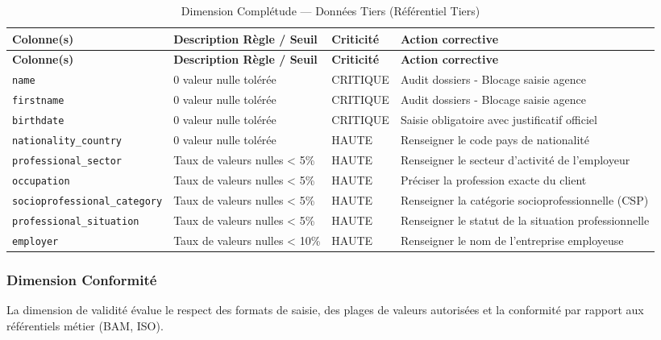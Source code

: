 \begin{longtable}{|p{}|p{}|p{}|p{}|}
\caption{Dimension Complétude — Données Tiers (Référentiel Tiers)} \label{tab:completude_tiers} \\
\hline
\rowcolor{gray!20}
\textbf{Colonne(s)} & \textbf{Description Règle / Seuil} & \textbf{Criticité} & \textbf{Action corrective} \\
\hline
\endfirsthead
\hline
\rowcolor{gray!20}
\textbf{Colonne(s)} & \textbf{Description Règle / Seuil} & \textbf{Criticité} & \textbf{Action corrective} \\
\hline
\endhead
\texttt{name} & 0 valeur nulle tolérée & CRITIQUE & Audit dossiers - Blocage saisie agence \\
\hline
\texttt{firstname} & 0 valeur nulle tolérée & CRITIQUE & Audit dossiers - Blocage saisie agence \\
\hline
\texttt{birthdate} & 0 valeur nulle tolérée & CRITIQUE & Saisie obligatoire avec justificatif officiel \\
\hline
\texttt{nationality\_}\allowbreak\texttt{country} & 0 valeur nulle tolérée & HAUTE & Renseigner le code pays de nationalité \\
\hline
\texttt{professional\_}\allowbreak\texttt{sector} & Taux de valeurs nulles < 5\% & HAUTE & Renseigner le secteur d'activité de l'employeur \\
\hline
\texttt{occupation} & Taux de valeurs nulles < 5\% & HAUTE & Préciser la profession exacte du client \\
\hline
\texttt{socioprofessional\_}\allowbreak\texttt{category} & Taux de valeurs nulles < 5\% & HAUTE & Renseigner la catégorie socioprofessionnelle (CSP) \\
\hline
\texttt{professional\_}\allowbreak\texttt{situation} & Taux de valeurs nulles < 5\% & HAUTE & Renseigner le statut de la situation professionnelle \\
\hline
\texttt{employer} & Taux de valeurs nulles < 10\% & HAUTE & Renseigner le nom de l'entreprise employeuse \\
\hline
\end{longtable}

\subsubsection{Dimension Conformité}
La dimension de validité évalue le respect des formats de saisie, des plages de valeurs autorisées et la conformité par rapport aux référentiels métier (BAM, ISO).

